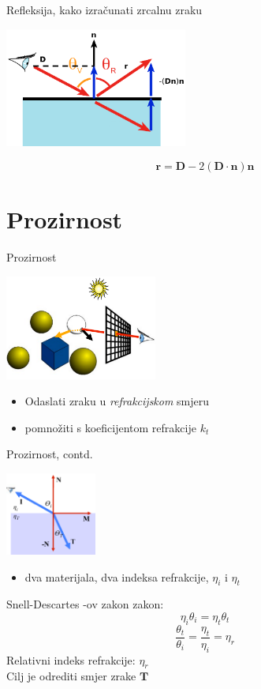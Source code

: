 \documentclass[9pt]{beamer}
\begin{document}
\begin{frame}{Refleksija, kako izračunati zrcalnu zraku}

\begin{center}
\includegraphics[width=6cm]{slike/refleksija_02.png}
\end{center}
$$\mathbf{r} = \mathbf{D} - 2(\mathbf{D}\cdot \mathbf{n})\mathbf{n}$$
\end{frame}


\section{Prozirnost}
\begin{frame}{Prozirnost}

\begin{center}
\includegraphics[width=5cm]{slike/prozirnost_01.png}
\end{center}
\begin{itemize}
\item Odaslati zraku u \textit{refrakcijskom} smjeru
\item pomnožiti s koeficijentom refrakcije $k_t$
\end{itemize}
\end{frame}

\begin{frame}{Prozirnost, contd.}

\begin{center}
\includegraphics[width=3cm]{slike/prozirnost_02.png}
\end{center}
\begin{itemize}
\item dva materijala, dva indeksa refrakcije, $\eta_i$ i $\eta_t$
\end{itemize}
Snell-Descartes -ov zakon zakon:
$$\eta_i \theta_i = \eta_t \theta_t$$
$$\frac{\theta_t}{\theta_i} = \frac{\eta_t}{\eta_i} = \eta_r$$
Relativni indeks refrakcije: $\eta_r$\\
Cilj je odrediti smjer zrake $\mathbf{T}$
\end{frame}
\end{document}

